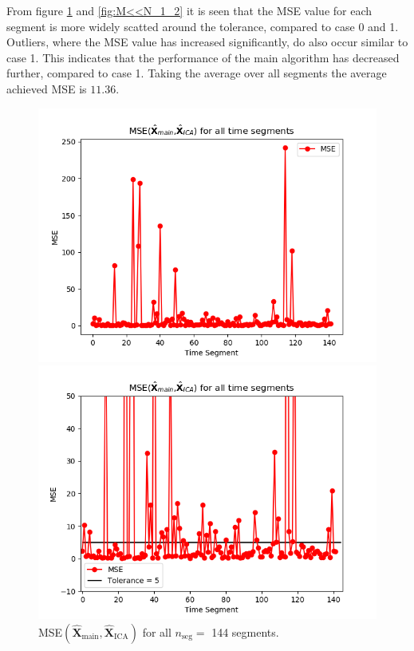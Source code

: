 From figure \ref{fig:M<<N_1} and \ref{fig:M<<N_1_2} it is seen that the MSE value for each segment is more widely scatted around the tolerance, compared to case 0 and 1. 
Outliers, where the MSE value has increased significantly, do also occur similar to case 1. 
This indicates that the performance of the main algorithm has decreased further, compared to case 1. Taking the average over all segments the average achieved MSE is $11.36$.
\begin{figure}[H]
\begin{widepage}
    \begin{minipage}[t]{.45\textwidth}
		\centering
		\includegraphics[width=1\linewidth]{figures/ch_7/resultat/average_mse_second_removed_ica}
	\caption{MSE$\left(\hat{\mathbf{X}}_{\text{main}},\hat{\mathbf{X}}_{\text{ICA}}\right)$ for all $n_{\text{seg}} = $ 144 segments.}
	\label{fig:M<<N_1}
    \end{minipage} 
\hspace{0.5cm}
    \begin{minipage}[t]{.45\textwidth}
        \centering
		\includegraphics[width=1\linewidth]{figures/ch_7/resultat/average_mse_second_removed_ica_zoom.png}

\end{minipage}
\end{widepage}
\end{figure}
